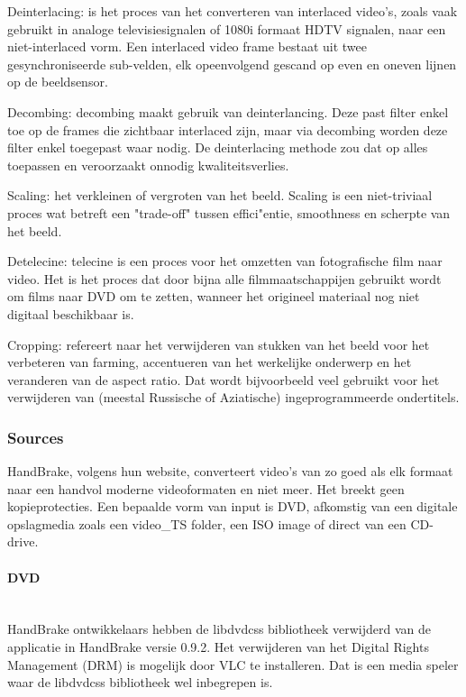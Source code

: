 \begin{list}{*}{}
\item Deinterlacing\cite{Deinterlacing}: is het proces van het converteren van interlaced video's, zoals vaak gebruikt in analoge televisiesignalen of 1080i formaat HDTV signalen, naar een niet-interlaced vorm. Een interlaced video frame bestaat uit twee gesynchroniseerde sub-velden, elk opeenvolgend gescand op even en oneven lijnen op de beeldsensor.

\item Decombing\cite{Decomb}: decombing maakt gebruik van deinterlancing. Deze past filter enkel toe op de frames die zichtbaar interlaced zijn, maar via decombing worden deze filter enkel toegepast waar nodig. De deinterlacing methode zou dat op alles toepassen en veroorzaakt onnodig kwaliteitsverlies.

\item Scaling\cite{scaling}: het verkleinen of vergroten van het beeld. Scaling is een niet-triviaal proces wat betreft een "trade-off" tussen effici"entie, smoothness en scherpte van het beeld.

\item Detelecine\cite{Telecine}: telecine is een proces voor het omzetten van fotografische film naar video. Het is het proces dat door bijna alle filmmaatschappijen gebruikt wordt om films naar DVD om te zetten, wanneer het origineel materiaal nog niet digitaal beschikbaar is.

\item Cropping\cite{Cropping}: refereert naar het verwijderen van stukken van het beeld voor het verbeteren van farming, accentueren van het werkelijke onderwerp en het veranderen van de aspect ratio. Dat wordt bijvoorbeeld veel gebruikt voor het verwijderen van (meestal Russische of Aziatische) ingeprogrammeerde ondertitels.
\end{list}

\subsubsection{Sources}

HandBrake, volgens hun website, converteert video's van zo goed als elk formaat naar een handvol moderne videoformaten en niet meer. Het breekt geen kopieprotecties. Een bepaalde vorm van input is DVD, afkomstig van een digitale opslagmedia zoals een video\_TS folder, een ISO image of direct van een CD-drive.

\paragraph{DVD}
\ \\[12pt]
HandBrake ontwikkelaars hebben de libdvdcss\cite{Libdvdcss} bibliotheek verwijderd van de applicatie in HandBrake versie 0.9.2. Het verwijderen van het Digital Rights Management (DRM)\cite{DRM} is mogelijk door VLC\cite{VLC} te installeren. Dat is een media speler waar de libdvdcss bibliotheek wel inbegrepen is.


